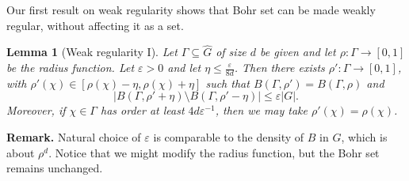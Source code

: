 \documentclass[a4paper,11pt]{article}
\numberwithin{theorem}{section}
\newtheorem{lemma}[theorem]{Lemma}
\theoremstyle{definition}
\begin{document}
Our first result on weak regularity shows that Bohr set can be made weakly regular, without affecting it as a set.

\begin{lemma}[Weak regularity I]\label{bohrwreg1}
    Let $\Gamma \subseteq \hat{G}$ of size $d$ be given and let $\rho : \Gamma \to [0,1]$ be the radius function. Let $\varepsilon > 0$ and let $\eta \leq \frac{\varepsilon}{8d}$. Then there exists $\rho' : \Gamma \to [0,1]$, with $\rho'(\chi) \in [\rho(\chi) - \eta, \rho(\chi) + \eta]$ such that $B(\Gamma, \rho') = B(\Gamma, \rho)$ and
    \[|B(\Gamma, \rho' + \eta) \setminus B(\Gamma, \rho' - \eta)| \leq \varepsilon |G|.\]
    \indent Moreover, if $\chi \in \Gamma$ has order at least $4d \varepsilon^{-1}$, then we may take $\rho'(\chi) = \rho(\chi)$.
\end{lemma}

\noindent\textbf{Remark.} Natural choice of $\varepsilon$ is comparable to the density of $B$ in $G$, which is about $\rho^d$. Notice that we might modify the radius function, but the Bohr set remains unchanged.
\end{document}
